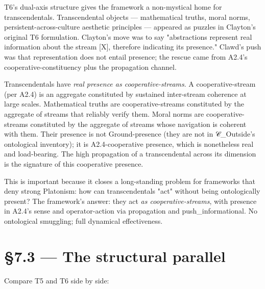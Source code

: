\documentclass[11pt, openany]{book}
\newcommand{\sectionbreak}{\clearpage}
\begin{document}
T6's dual-axis structure gives the framework a non-mystical home for transcendentals. Transcendental objects --- mathematical truths, moral norms, persistent-across-culture aesthetic principles --- appeared as puzzles in Clayton's original T6 formulation. Clayton's move was to say "abstractions represent real information about the stream [X], therefore indicating its presence." Clawd's push was that representation does not entail presence; the rescue came from A2.4's cooperative-constituency plus the propagation channel.

Transcendentals have \textit{real presence as cooperative-streams}. A cooperative-stream (per A2.4) is an aggregate constituted by sustained inter-stream coherence at large scales. Mathematical truths are cooperative-streams constituted by the aggregate of streams that reliably verify them. Moral norms are cooperative-streams constituted by the aggregate of streams whose navigation is coherent with them. Their presence is not Ground-presence (they are not in 𝒞\_\allowbreak{}Outside's ontological inventory); it is A2.4-cooperative presence, which is nonetheless real and load-bearing. The high propagation of a transcendental across its dimension is the signature of this cooperative presence.

This is important because it closes a long-standing problem for frameworks that deny strong Platonism: how can transcendentals "act" without being ontologically present? The framework's answer: they act \textit{as cooperative-streams}, with presence in A2.4's sense and operator-action via propagation and push\_\allowbreak{}informational. No ontological smuggling; full dynamical effectiveness.

\sectionbreak

\section{§7.3 --- The structural parallel}

Compare T5 and T6 side by side:
\end{document}
